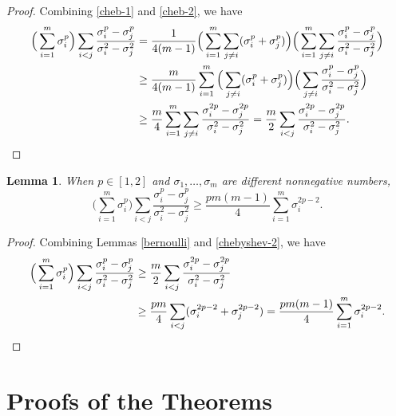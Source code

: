 \documentclass[11pt, a4paper]{article}
\newtheorem{lemma}{Lemma}
\theoremstyle{remark}
\begin{document}
\begin{proof}
Combining \eqref{cheb-1} and \eqref{cheb-2}, we have
\begin{align*}
  \Big(\sum_{i=1}^m\sigma_i^p\Big)\sum_{i<j}\frac{\sigma_i^p-\sigma_j^p}{\sigma_i^2-\sigma_j^2}&= \frac{1}{4(m-1)}\Big(\sum_{i=1}^m\sum_{j\neq i}(\sigma_i^p+\sigma_j^p)\Big)\Big(\sum_{i=1}^m\sum_{j\neq i}\frac{\sigma_i^p-\sigma_j^p}{\sigma_i^2-\sigma_j^2}\Big) \notag\\
  &\ge \frac{m}{4(m-1)}\sum_{i=1}^m\Big(\sum_{j\neq i}(\sigma_i^p+\sigma_j^p)\Big)\Big(\sum_{j\neq i}\frac{\sigma_i^p-\sigma_j^p}{\sigma_i^2-\sigma_j^2}\Big)\notag\\
  &\ge \frac{m}{4}\sum_{i=1}^m\sum_{j\neq i}\frac{\sigma_i^{2p}-\sigma_j^{2p}}{\sigma_i^{2}-\sigma_j^2}=\frac{m}{2}\sum_{i<j}\frac{\sigma_i^{2p}-\sigma_j^{2p}}{\sigma_i^2-\sigma_j^2}.
\end{align*} 
\end{proof}

\begin{lemma} \label{nns-inq}
When $p\in[1,2]$ and $\sigma_1,\dots,\sigma_m$ are different nonnegative numbers, $$\Big(\sum_{i=1}^m\sigma_i^p\Big)\sum_{i<j}\frac{\sigma_i^p-\sigma_j^p}{\sigma_i^2-\sigma_j^2}\ge\frac{pm(m-1)}{4}\sum_{i=1}^m\sigma_i^{2p-2}.$$
\end{lemma}
\begin{proof}
Combining Lemmas \ref{bernoulli} and \ref{chebyshev-2}, we have
\begin{align*}
  \Big(\sum_{i=1}^m\sigma_i^p\Big)\sum_{i<j}\frac{\sigma_i^p-\sigma_j^p}{\sigma_i^2-\sigma_j^2}&\ge \frac{m}{2}\sum_{i<j}\frac{\sigma_i^{2p}-\sigma_j^{2p}}{\sigma_i^2-\sigma_j^2} \notag\\
  &\ge \frac{pm}{4}\sum_{i<j}(\sigma_i^{2p-2}+\sigma_j^{2p-2})=\frac{pm(m-1)}{4}\sum_{i=1}^m\sigma_i^{2p-2}.
\end{align*} 
\end{proof}

\section{Proofs of the Theorems}
\end{document}
